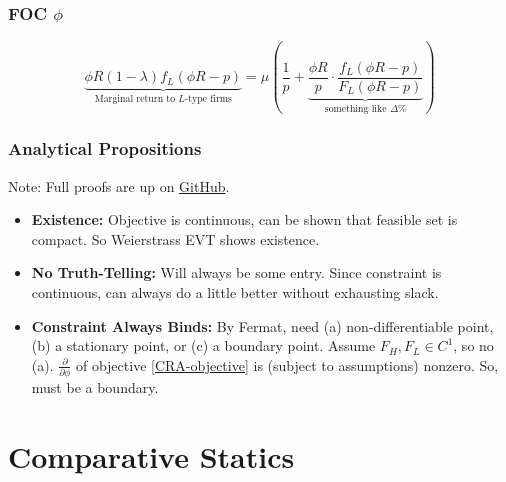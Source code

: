 \documentclass{beamer}
\begin{document}
\begin{frame}
    \frametitle{FOC $\phi$}

    \begin{equation}
        \label{FOC-phi}
        \underbrace{\phi R (1 - \lambda)f_L(\phi R - p)}_{\text{Marginal return to $L$-type firms}} = \mu \left(\frac{1}{p} + \underbrace{\frac{\phi R}{p} \cdot \frac{f_L(\phi R - p)}{F_L(\phi R - p)}}_{\text{something like $\Delta \%$}}\right)
    \end{equation}
\end{frame}

\begin{frame}
    \frametitle{Analytical Propositions}

    Note: Full proofs are up on \href{https://github.com/arnavs/credit-pricing}{\color{blue} GitHub}.

    \begin{itemize}[<+>]
        \item \textbf{Existence:} Objective is continuous, can be shown that feasible set is compact. So Weierstrass EVT shows existence.
        \item \textbf{No Truth-Telling:} Will always be some entry. Since constraint is continuous, can always do a little better without exhausting slack.
        \item \textbf{Constraint Always Binds:} By Fermat, need (a) non-differentiable point, (b) a stationary point, or (c) a boundary point. Assume $F_H, F_L \in C^1$, so no (a). $\frac{\partial}{\partial \phi}$ of objective \eqref{CRA-objective} is (subject to assumptions) nonzero. So, must be a boundary.
    \end{itemize}

\end{frame}

\section{Comparative Statics}
\end{document}
